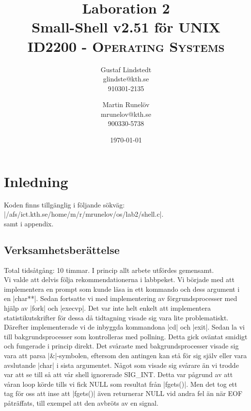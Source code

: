 \documentclass[paper=a4, fontsize=11pt]{scrartcl} %
\title{ 
\huge Laboration 2 \\ Small-Shell v2.51 för UNIX \\ %
\vspace{10pt}
\normalfont \normalsize 
\textsc{ID2200 - Operating Systems } \\ [25pt] %
}
\author{Gustaf Lindstedt \\ glindste@kth.se \\ 910301-2135 \and Martin Runelöv \\ mrunelov@kth.se \\ 900330-5738}
\date{\vspace{8pt}\normalsize\today} %
\numberwithin{equation}{section} %
\numberwithin{figure}{section} %
\numberwithin{table}{section} %
\begin{document}
\maketitle

\section{Inledning}

Koden finns tillgänglig i följande sökväg:\\
|/afs/ict.kth.se/home/m/r/mrunelov/os/lab2/shell.c|.\\

samt i appendix.



\subsection{Verksamhetsberättelse}
Total tidsåtgång: 10 timmar. I princip allt arbete utfördes gemensamt.\\

Vi valde att delvis följa rekommendationerna i labbpeket.
Vi började med att implementera en prompt som kunde läsa in ett kommando och dess argument i en |char**|.
Sedan fortsatte vi med implementering av förgrundsprocesser med hjälp av |fork| och |execvp|.
Det var inte helt enkelt att implementera statistikutskrifter för dessa då tidtagning visade sig vara lite problematiskt.
Därefter implementerade vi de inbyggda kommandona |cd| och |exit|.
Sedan la vi till bakgrundsprocesser som kontrolleras med pollning.
Detta gick oväntat smidigt och fungerade i princip direkt.
Det svåraste med bakgrundsprocesser visade sig vara att parsa |&|-symbolen,
eftersom den antingen kan stå för sig själv eller vara avslutande |char| i sista argumentet.
Något som visade sig svårare än vi trodde var att se till så att vår shell ignorerade SIG\_INT.
Detta var pågrund av att våran loop körde tills vi fick NULL som resultat från |fgets()|.
Men det tog ett tag för oss att inse att |fgets()| även returnerar NULL vid andra fel än när EOF påträffats, till exempel att den avbröts av en signal.
\end{document}
